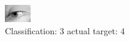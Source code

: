 \begin{figure}[h!]
\begin{center}
\includegraphics[width=0.60\columnwidth]{figures/ID3055_class_3_target_4.png}
\end{center}
\caption{ Classification: 3 actual target: 4}
\label{fig:ID3055_class_3_target_4}
\end{figure}
